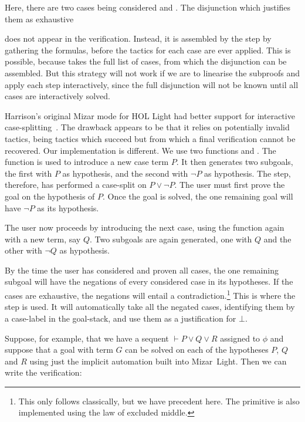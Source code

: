{\samepage Here, there are two cases being considered  and . The disjunction which justifies them as exhaustive
\begin{center}\end{center}}

\noindent does not appear in the verification. Instead, it is assembled by the  step by gathering the  formulas, before the tactics for each case are ever applied. This is possible, because  takes the full list of cases, from which the disjunction can be assembled. But this strategy will not work if we are to linearise the subproofs and apply each step interactively, since the full disjunction will not be known until all cases are interactively solved.

Harrison's original Mizar mode for HOL Light had better support for interactive case-splitting~\cite{MizarHOL}. The drawback appears to be that it relies on potentially invalid tactics, being tactics which succeed but from which a final verification cannot be recovered. Our implementation is different. We use two functions  and . The  function is used to introduce a new case term $P$. It then generates two subgoals, the first with $P$ as hypothesis, and the second with $\neg P$ as hypothesis. The  step, therefore, has performed a case-split on $P\vee\neg P$. The user must first prove the goal on the hypothesis of $P$. Once the goal is solved, the one remaining goal will have $\neg P$ as its hypothesis.

The user now proceeds by introducing the next case, using the  function again with a new term, say $Q$. Two subgoals are again generated, one with $Q$ and the other with $\neg Q$ as hypothesis.

By the time the user has considered and proven all cases, the one remaining subgoal will have the negations of every considered case in its hypotheses. If the cases are exhaustive, the negations will entail a contradiction.\footnote{This only follows classically, but we have precedent here. The  primitive is also implemented using the law of excluded middle.} This is where the  step is used. It will automatically take all the negated cases, identifying them by a case-label  in the goal-stack, and use them as a justification for $\bot$.

Suppose, for example, that we have a sequent $\vdash P \vee Q \vee R$ assigned to $\phi$ and suppose that a goal with term $G$ can be solved on each of the hypotheses $P$, $Q$ and $R$ using just the implicit automation built into Mizar~Light. Then we can write the verification:

